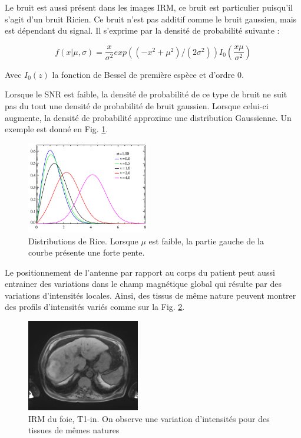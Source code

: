 Le bruit est aussi présent dans les images IRM, ce bruit est particulier puisqu'il s'agit d'un bruit Ricien. Ce bruit n'est pas additif comme le bruit gaussien, mais est dépendant du signal. Il s'exprime par la densité de probabilité suivante : 

\begin{equation}
    f(x | \mu, \sigma) = \frac{x}{\sigma^2} exp ( (-x^2 + \mu^2)/(2\sigma^2) ) I_0 (\frac{x\mu}{\sigma^2})
    \end{equation}

Avec $I_0(z)$ la fonction de Bessel de première espèce et d'ordre 0. 

Lorsque le SNR est faible, la densité de probabilité de ce type de bruit ne suit pas du tout une densité de probabilité de bruit gaussien. Lorsque celui-ci augmente, la densité de probabilité approxime une distribution Gaussienne. Un exemple est donné en Fig. \ref{fig:MRI_Rice}.

\begin{figure}
    \centering
    \includegraphics[height=4cm]{Images/rice_PDF.png}
    \caption{Distributions de Rice. Lorsque $\mu$ est faible, la partie gauche de la courbe présente une forte pente.}
    \label{fig:MRI_Rice}
\end{figure}

Le positionnement de l'antenne par rapport au corps du patient peut aussi entrainer des variations dans le champ magnétique global qui résulte par des variations d'intensités locales. Ainsi, des tissus de même nature peuvent montrer des profils d'intensités variés comme sur la Fig. \ref{fig:MRI_variations}.

\begin{figure}
    \centering
    \includegraphics[height=4cm]{Images/MRI_field_variations.png}
    \caption{IRM du foie, T1-in. On observe une variation d'intensités pour des tissues de mêmes natures}
    \label{fig:MRI_variations}
\end{figure}

